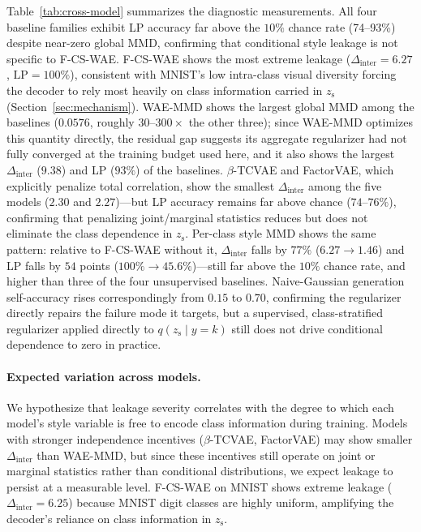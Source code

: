 \documentclass[10pt]{article}
\newcommand{\ours}{F-CS-WAE}
\newcommand{\zs}{z_{\mathrm{s}}}
\begin{document}
Table~\ref{tab:cross-model} summarizes the diagnostic measurements.
All four baseline families exhibit LP accuracy far above the $10\%$ chance rate
(74--93\%) despite near-zero global MMD, confirming that conditional style
leakage is not specific to \ours{}.
\ours{} shows the most extreme leakage ($\Delta_{\mathrm{inter}}=6.27$,
$\mathrm{LP}=100\%$), consistent with MNIST's low intra-class visual diversity
forcing the decoder to rely most heavily on class information carried in $\zs$
(Section~\ref{sec:mechanism}).
WAE-MMD shows the largest global MMD among the baselines ($0.0576$, roughly
$30$--$300\times$ the other three); since WAE-MMD optimizes this quantity
directly, the residual gap suggests its aggregate regularizer had not fully
converged at the training budget used here, and it also shows the largest
$\Delta_{\mathrm{inter}}$ ($9.38$) and LP ($93\%$) of the baselines.
$\beta$-TCVAE and FactorVAE, which explicitly penalize total correlation,
show the smallest $\Delta_{\mathrm{inter}}$ among the five models
($2.30$ and $2.27$)—but LP accuracy remains far above chance ($74$--$76\%$),
confirming that penalizing joint/marginal statistics reduces but does not
eliminate the class dependence in $\zs$.
Per-class style MMD shows the same pattern: relative to \ours{} without it,
$\Delta_{\mathrm{inter}}$ falls by $77\%$ ($6.27\to1.46$) and LP falls by $54$
points ($100\%\to45.6\%$)—still far above the $10\%$ chance rate, and higher than
three of the four unsupervised baselines.
Naive-Gaussian generation self-accuracy rises correspondingly from $0.15$ to
$0.70$, confirming the regularizer directly repairs the failure mode it targets,
but a supervised, class-stratified regularizer applied directly to $q(\zs\mid y{=}k)$
still does not drive conditional dependence to zero in practice.

\paragraph{Expected variation across models.}
We hypothesize that leakage severity correlates with the degree to which each
model's style variable is free to encode class information during training.
Models with stronger independence incentives ($\beta$-TCVAE, FactorVAE) may show
smaller $\Delta_{\mathrm{inter}}$ than WAE-MMD, but since these incentives still
operate on joint or marginal statistics rather than conditional distributions,
we expect leakage to persist at a measurable level.
F-CS-WAE on MNIST shows extreme leakage ($\Delta_{\mathrm{inter}}=6.25$) because
MNIST digit classes are highly uniform, amplifying the decoder's reliance on
class information in $\zs$.
\end{document}
